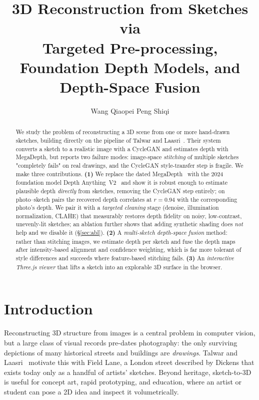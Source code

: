 \documentclass[10pt,twocolumn,letterpaper]{article}
\title{\vspace{-2em}\textbf{\Large 3D Reconstruction from Sketches via\\
Targeted Pre-processing, Foundation Depth Models, and Depth-Space Fusion}}
\author{
Wang Qiaopei \quad Peng Shiqi
}
\date{}
\begin{document}
\maketitle

\begin{abstract}
We study the problem of reconstructing a 3D scene from one or more
hand-drawn sketches, building directly on the pipeline of Talwar and
Laasri~\cite{talwar2018sketch}. Their system converts a sketch to a
realistic image with a CycleGAN and estimates depth with MegaDepth, but
reports two failure modes: image-space \emph{stitching} of multiple
sketches "completely fails" on real drawings, and the CycleGAN
style-transfer step is fragile. We make three contributions.
\textbf{(1)} We replace the dated MegaDepth~\cite{li2018megadepth} with the
2024 foundation model Depth Anything~V2~\cite{yang2024depthv2} and show it is
robust enough to estimate plausible depth \emph{directly} from sketches,
removing the CycleGAN step entirely; on photo--sketch pairs the recovered
depth correlates at $r=0.94$ with the corresponding photo's depth.
We pair it with a \emph{targeted cleaning} stage (denoise, illumination
normalization, CLAHE) that measurably restores depth fidelity on noisy,
low-contrast, unevenly-lit sketches; an ablation further shows that adding
synthetic shading does \emph{not} help and we disable it (\S\ref{sec:abl}).
\textbf{(2)} A \emph{multi-sketch depth-space fusion} method: rather than
stitching images, we estimate depth per sketch and fuse the depth maps
after intensity-based alignment and confidence weighting, which is far
more tolerant of style differences and succeeds where feature-based
stitching fails.
\textbf{(3)} An \emph{interactive Three.js viewer} that lifts a sketch
into an explorable 3D surface in the browser.
\end{abstract}

\section{Introduction}
Reconstructing 3D structure from images is a central problem in computer
vision, but a large class of visual records pre-dates photography: the
only surviving depictions of many historical streets and buildings are
\emph{drawings}. Talwar and Laasri~\cite{talwar2018sketch} motivate this
with Field Lane, a London street described by Dickens that exists today
only as a handful of artists' sketches. Beyond heritage, sketch-to-3D is
useful for concept art, rapid prototyping, and education, where an artist
or student can pose a 2D idea and inspect it volumetrically.
\end{document}

